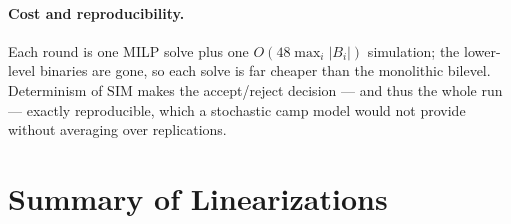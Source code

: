 \documentclass[12pt, letterpaper]{article}
\begin{document}
\paragraph{Cost and reproducibility.} Each round is one MILP solve plus
one $O(48\max_i|B_i|)$ simulation; the lower-level binaries are gone, so
each solve is far cheaper than the monolithic bilevel. Determinism of
$\mathrm{SIM}$ makes the accept/reject decision --- and thus the whole run
--- exactly reproducible, which a stochastic camp model would not provide
without averaging over replications.

\section{Summary of Linearizations}
\label{sec:nonlinkpi}
\end{document}
